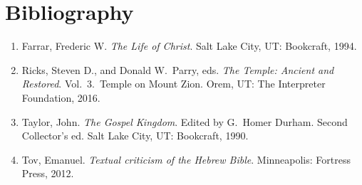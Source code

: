 \section{Bibliography}
\begin{enumerate}
  \item Farrar, Frederic W. \textit{The Life of Christ}. Salt Lake City, UT: Bookcraft, 1994.
  \item Ricks, Steven D., and Donald W.\ Parry, eds. \textit{The Temple: Ancient and Restored}. Vol.\ 3.\ Temple on Mount Zion. Orem, UT: The Interpreter Foundation, 2016.
  \item Taylor, John. \textit{The Gospel Kingdom}. Edited by G.\ Homer Durham. Second Collector's ed. Salt Lake City, UT: Bookcraft, 1990.
  \item Tov, Emanuel. \textit{Textual criticism of the Hebrew Bible}. Minneapolis: Fortress Press, 2012.
\end{enumerate}
